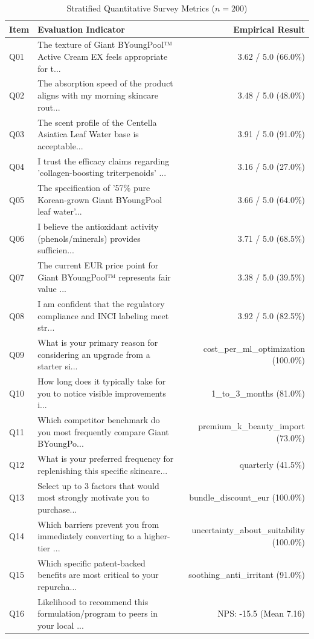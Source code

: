 \documentclass[10pt,twocolumn,a4paper]{article}
\begin{document}
\begin{table}[t]
\centering
\caption{Stratified Quantitative Survey Metrics ($n = 200$)}
\label{tab:metrics}
\small
\begin{tabularx}{\textwidth}{l X r}
\toprule
\textbf{Item} & \textbf{Evaluation Indicator} & \textbf{Empirical Result} \\
\midrule
Q01 & The texture of Giant BYoungPool™ Active Cream EX feels appropriate for t... & 3.62 / 5.0 (66.0\%) \\
Q02 & The absorption speed of the product aligns with my morning skincare rout... & 3.48 / 5.0 (48.0\%) \\
Q03 & The scent profile of the Centella Asiatica Leaf Water base is acceptable... & 3.91 / 5.0 (91.0\%) \\
Q04 & I trust the efficacy claims regarding 'collagen-boosting triterpenoids' ... & 3.16 / 5.0 (27.0\%) \\
Q05 & The specification of '57\% pure Korean-grown Giant BYoungPool leaf water'... & 3.66 / 5.0 (64.0\%) \\
Q06 & I believe the antioxidant activity (phenols/minerals) provides sufficien... & 3.71 / 5.0 (68.5\%) \\
Q07 & The current EUR price point for Giant BYoungPool™ represents fair value ... & 3.38 / 5.0 (39.5\%) \\
Q08 & I am confident that the regulatory compliance and INCI labeling meet str... & 3.92 / 5.0 (82.5\%) \\
Q09 & What is your primary reason for considering an upgrade from a starter si... & cost\_per\_ml\_optimization (100.0\%) \\
Q10 & How long does it typically take for you to notice visible improvements i... & 1\_to\_3\_months (81.0\%) \\
Q11 & Which competitor benchmark do you most frequently compare Giant BYoungPo... & premium\_k\_beauty\_import (73.0\%) \\
Q12 & What is your preferred frequency for replenishing this specific skincare... & quarterly (41.5\%) \\
Q13 & Select up to 3 factors that would most strongly motivate you to purchase... & bundle\_discount\_eur (100.0\%) \\
Q14 & Which barriers prevent you from immediately converting to a higher-tier ... & uncertainty\_about\_suitability (100.0\%) \\
Q15 & Which specific patent-backed benefits are most critical to your repurcha... & soothing\_anti\_irritant (91.0\%) \\
Q16 & Likelihood to recommend this formulation/program to peers in your local ... & NPS: -15.5 (Mean 7.16) \\
\bottomrule
\end{tabularx}
\end{table}
\end{document}
